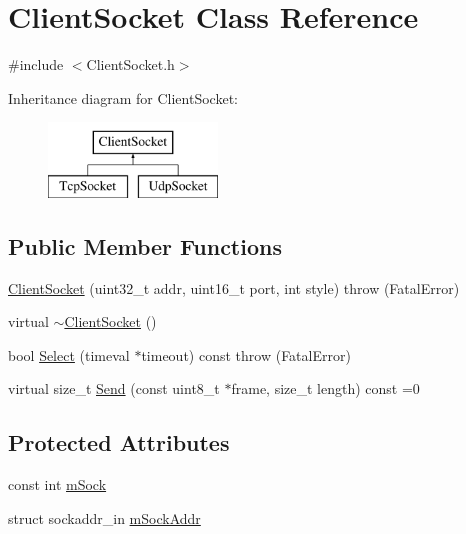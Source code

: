 \hypertarget{class_client_socket}{\section{Client\-Socket Class Reference}
\label{class_client_socket}
}


{\ttfamily \#include $<$Client\-Socket.\-h$>$}

Inheritance diagram for Client\-Socket\-:\begin{figure}[H]
\begin{center}
\leavevmode
\includegraphics[height=2.000000cm]{class_client_socket}
\end{center}
\end{figure}
\subsection*{Public Member Functions}
\begin{DoxyCompactItemize}
\item 
\hyperlink{class_client_socket_a9ef0e9b489c27a59ddcc5b863d70c5c4}{Client\-Socket} (uint32\-\_\-t addr, uint16\-\_\-t port, int style)  throw (\-Fatal\-Error)
\item 
virtual \hyperlink{class_client_socket_a9c8af4fc4f56b62ef0ff7d67037f65a3}{$\sim$\-Client\-Socket} ()
\item 
bool \hyperlink{class_client_socket_ab024bbccfda7b4983177e318b7ac32a7}{Select} (timeval $\ast$timeout) const   throw (\-Fatal\-Error)
\item 
virtual size\-\_\-t \hyperlink{class_client_socket_ad53cfcbf3eebbfb8b8314f58d3354edd}{Send} (const uint8\-\_\-t $\ast$frame, size\-\_\-t length) const =0
\end{DoxyCompactItemize}
\subsection*{Protected Attributes}
\begin{DoxyCompactItemize}
\item 
const int \hyperlink{class_client_socket_acb5029d09ef913c0b444e97f2cc98bef}{m\-Sock}
\item 
struct sockaddr\-\_\-in \hyperlink{class_client_socket_acbf9ed9f1ebac9348a2d1c77b516acbc}{m\-Sock\-Addr}
\end{DoxyCompactItemize}


